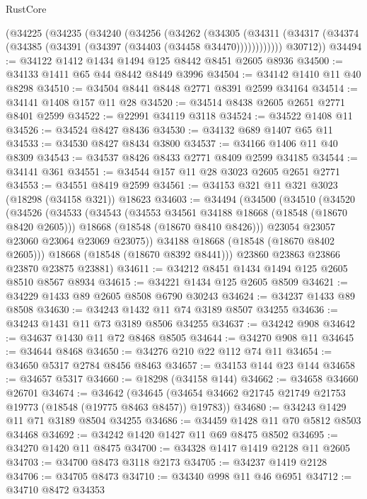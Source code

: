 \begin{lexlean}{RustCore}
\begin{coremodule}
    (@34225
      (@34235
        (@34240
          (@34256
            (@34262
              (@34305
                (@34311 (@34317 (@34374 (@34385 (@34391 (@34397 (@34403 (@34458 @34470))))))))))))
        @30712))
@34494 := @34122 @1412 @1434 @1494 @125 @8442 @8451 @2605 @8936
@34500 := @34133 @1411 @65 @44 @8442 @8449 @3996
@34504 := @34142 @1410 @11 @40 @8298
@34510 := @34504 @8441 @8448 @2771 @8391 @2599 @34164
@34514 := @34141 @1408 @157 @11 @28
@34520 := @34514 @8438 @2605 @2651 @2771 @8401 @2599
@34522 := @22991 @34119 @3118
@34524 := @34522 @1408 @11
@34526 := @34524 @8427 @8436
@34530 := @34132 @689 @1407 @65 @11
@34533 := @34530 @8427 @8434 @3800
@34537 := @34166 @1406 @11 @40 @8309
@34543 := @34537 @8426 @8433 @2771 @8409 @2599 @34185
@34544 := @34141 @361
@34551 := @34544 @157 @11 @28 @3023 @2605 @2651 @2771
@34553 := @34551 @8419 @2599
@34561 := @34153 @321 @11 @321 @3023 (@18298 (@34158 @321)) @18623
@34603 := @34494
    (@34500
      (@34510
        (@34520
          (@34526
            (@34533
              (@34543
                (@34553 @34561 @34188 @18668 (@18548 (@18670 @8420 @2605)))
                @18668
                (@18548 (@18670 @8410 @8426)))
              @23054
              @23057
              @23060
              @23064
              @23069
              @23075))
          @34188
          @18668
          (@18548 (@18670 @8402 @2605)))
        @18668
        (@18548 (@18670 @8392 @8441)))
      @23860
      @23863
      @23866
      @23870
      @23875
      @23881)
@34611 := @34212 @8451 @1434 @1494 @125 @2605 @8510 @8567 @8934
@34615 := @34221 @1434 @125 @2605 @8509
@34621 := @34229 @1433 @89 @2605 @8508 @6790 @30243
@34624 := @34237 @1433 @89 @8508
@34630 := @34243 @1432 @11 @74 @3189 @8507 @34255
@34636 := @34243 @1431 @11 @73 @3189 @8506 @34255
@34637 := @34242 @908
@34642 := @34637 @1430 @11 @72 @8468 @8505
@34644 := @34270 @908 @11
@34645 := @34644 @8468
@34650 := @34276 @210 @22 @112 @74 @11
@34654 := @34650 @5317 @2784 @8456 @8463
@34657 := @34153 @144 @23 @144
@34658 := @34657 @5317
@34660 := @18298 (@34158 @144)
@34662 := @34658 @34660 @26701
@34674 := @34642
    (@34645 (@34654 @34662 @21745 @21749 @21753 @19773 (@18548 (@19775 @8463 @8457)) @19783))
@34680 := @34243 @1429 @11 @71 @3189 @8504 @34255
@34686 := @34459 @1428 @11 @70 @5812 @8503 @34468
@34692 := @34242 @1420 @1427 @11 @69 @8475 @8502
@34695 := @34270 @1420 @11 @8475
@34700 := @34328 @1417 @1419 @2128 @11 @2605
@34703 := @34700 @8473 @3118 @2173
@34705 := @34237 @1419 @2128
@34706 := @34705 @8473
@34710 := @34340 @998 @11 @46 @6951
@34712 := @34710 @8472 @34353

\end{coremodule}
\end{lexlean}
